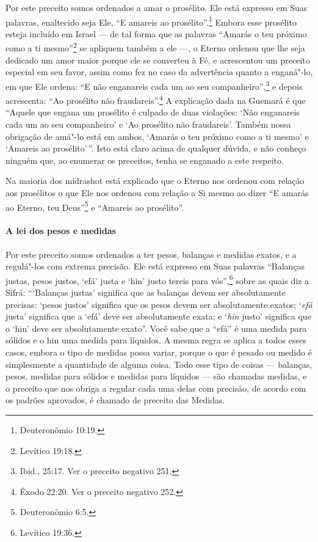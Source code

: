 \begin{multicols}{2}
Por este preceito somos ordenados a amar o prosélito. Ele está expresso
em Suas palavras, enaltecido seja Ele, ``E amareis ao prosélito''.\footnote{Deuteronômio 10:19.} Embora esse prosélito esteja incluído em Israel
--- de tal forma que as palavras ``Amarás o teu próximo como a ti mesmo''\footnote{Levítico 19:18.} se apliquem também a ele ---, o Eterno ordenou que lhe seja
dedicado um amor maior porque ele se converteu à Fé, e acrescentou um
preceito especial em seu favor, assim como fez no caso da advertência
quanto a enganá"-lo, em que Ele ordena: ``E não enganareis cada um ao seu
companheiro'',\footnote{Ibid., 25:17. Ver o preceito negativo 251.} e depois acrescenta: ``Ao prosélito não fraudareis''.\footnote{Êxodo 22:20. Ver o preceito negativo 252.} A explicação
dada na Guemará\starr{} é que ``Aquele que engana um prosélito é culpado de duas
violações: `Não enganareis cada um ao seu companheiro' e `Ao prosélito
não fraudareis'. Também nossa obrigação de amá"-lo está em ambos, `Amarás
o teu próximo como a ti mesmo' e `Amareis ao prosélito'\,''. Isto está
claro acima de qualquer dúvida, e não conheço ninguém que, ao enumerar
os preceitos, tenha se enganado a este respeito.

Na maioria dos midrashot\starr{} está explicado que o Eterno nos ordenou com
relação aos prosélitos o que Ele nos ordenou com relação a Si mesmo ao
dizer ``E amarás ao Eterno, teu Deus''\footnote{Deuteronômio 6:5.} e ``Amareis ao
prosélito''.

\paragraph{A lei dos pesos e medidas}

Por este preceito somos ordenados a ter pesos, balanças e medidas
exatos, e a regulá"-los com extrema precisão. Ele está expresso em Suas
palavras ``Balanças justas, pesos justos, `efá' justa e `hin' justo
tereis para vós'',\footnote{Levítico 19:36.} sobre as quais diz a Sifrá\starr:
```Balanças justas' significa que as balanças devem ser absolutamente
precisas: `pesos justos' significa que os pesos devem ser absolutamente
exatos; `\emph{efá} justa' significa que a `efá' deve ser absolutamente
exata; e `\emph{hin} justo' significa que o `hin' deve ser absolutamente
exato''. Você sabe que a ``efá'' é uma medida para sólidos e o hin\starr{}
uma medida para líquidos. A mesma regra se aplica a todos esses casos,
embora o tipo de medidas possa variar, porque o que é pesado ou medido é
simplesmente a quantidade de alguma coisa. Todo esse tipo de coisas ---
balanças, pesos, medidas para sólidos e medidas para líquidos --- são
chamadas medidas, e o preceito que nos obriga a regular cada uma delas
com precisão, de acordo com os padrões aprovados, é chamado de preceito
das Medidas.


\end{multicols}
